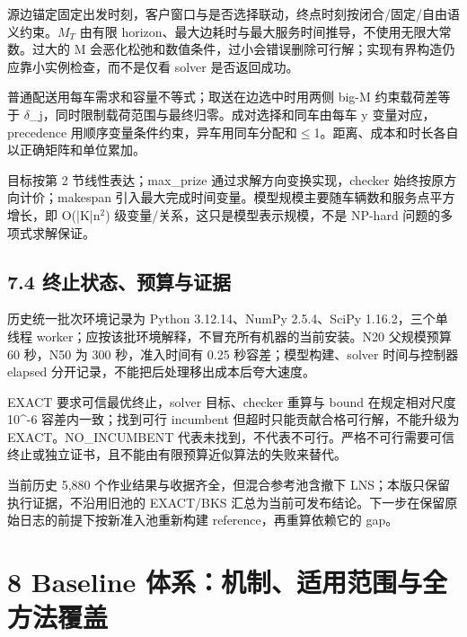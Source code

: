 \documentclass[UTF8,10pt,a4paper,fontset=fandol]{ctexart}
\begin{document}
源边锚定固定出发时刻，客户窗口与是否选择联动，终点时刻按闭合/\allowbreak{}固定/\allowbreak{}自由语义约束。\ensuremath{M_{T}} 由有限 horizon、最大边耗时与最大服务时间推导，不使用无限大常数。过大的 M 会恶化松弛和数值条件，过小会错误删除可行解；实现有界构造仍应靠小实例检查，而不是仅看 solver 是否返回成功。


普通配送用每车需求和容量不等式；取送在边选中时用两侧 big-M 约束载荷差等于 \ensuremath{\delta}\_\allowbreak{}j，同时限制载荷范围与最终归零。成对选择和同车由每车 y 变量对应，precedence 用顺序变量条件约束，异车用同车分配和\ensuremath{\le}1。距离、成本和时长各自以正确矩阵和单位累加。


目标按第 2 节线性表达；max\_\allowbreak{}prize 通过求解方向变换实现，checker 始终按原方向计价；makespan 引入最大完成时间变量。模型规模主要随车辆数和服务点平方增长，即 O(|K|n\ensuremath{^2}) 级变量/\allowbreak{}关系，这只是模型表示规模，不是 NP-hard 问题的多项式求解保证。


\subsection*{7.4 终止状态、预算与证据}


历史统一批次环境记录为 Python 3.12.14、NumPy 2.5.4、SciPy 1.16.2，三个单线程 worker；应按该批环境解释，不冒充所有机器的当前安装。N20 父规模预算 60 秒，N50 为 300 秒，准入时间有 0.25 秒容差；模型构建、solver 时间与控制器 elapsed 分开记录，不能把后处理移出成本后夸大速度。


EXACT 要求可信最优终止，solver 目标、checker 重算与 bound 在规定相对尺度 10\textasciicircum{}-6 容差内一致；找到可行 incumbent 但超时只能贡献合格可行解，不能升级为 EXACT。NO\_\allowbreak{}INCUMBENT 代表未找到，不代表不可行。严格不可行需要可信终止或独立证书，且不能由有限预算近似算法的失败来替代。


当前历史 5,880 个作业结果与收据齐全，但混合参考池含撤下 LNS；本版只保留执行证据，不沿用旧池的 EXACT/\allowbreak{}BKS 汇总为当前可发布结论。下一步在保留原始日志的前提下按新准入池重新构建 reference，再重算依赖它的 gap。


\section*{8 Baseline 体系：机制、适用范围与全方法覆盖}

\end{document}
